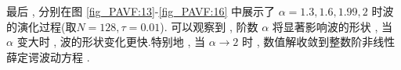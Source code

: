   最后 , 分别在图 \ref{fig_PAVF:13}-\ref{fig_PAVF:16} 中展示了 $\alpha=1.3 , 1.6 , 1.99 , 2$ 时波的演化过程(取$N=128 , \tau=0.01$).
  可以观察到 , 阶数 $\alpha$ 将显著影响波的形状 , 当 $\alpha$ 变大时 , 波的形状变化更快.特别地 , 当 $\alpha \rightarrow 2$ 时 , 
  数值解收敛到整数阶非线性薛定谔波动方程 \cite{zhangConservativeNumericalScheme2003,liCompactFiniteDifference2012,wangAnalysisNewConservative2006}.

  \begin{figure}[H]
	\begin{center}
	  \\
\end{center}
\end{figure}
